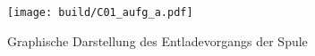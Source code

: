 \begin{figure}
    \centering
    \texttt{[image: build/C01\_aufg\_a.pdf]}
    \caption{Graphische Darstellung des Entladevorgangs der Spule}
    \label{fig:a_Entladung}
\end{figure}